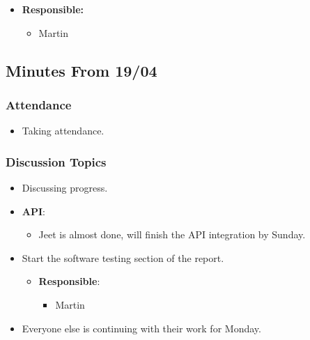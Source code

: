 \documentclass[12pt]{article}
\begin{document}
\begin{enumerate}
  \begin{itemize}
  \tightlist
  \item
    \textbf{Responsible:}

    \begin{itemize}
    \tightlist
    \item
      Martin
    \end{itemize}
  \end{itemize}
\end{enumerate}

\hypertarget{minutes-from-1904}{%
\subsection{Minutes From 19/04}\label{minutes-from-1904}}

\hypertarget{attendance-4}{%
\subsubsection{Attendance}\label{attendance-4}}

\begin{itemize}
\tightlist
\item
  Taking attendance.
\end{itemize}

\hypertarget{discussion-topics-3}{%
\subsubsection{Discussion Topics}\label{discussion-topics-3}}

\begin{itemize}
\tightlist
\item
  Discussing progress.
\item
  \textbf{API}:

  \begin{itemize}
  \tightlist
  \item
    Jeet is almost done, will finish the API integration by Sunday.
  \end{itemize}
\item
  Start the software testing section of the report.

  \begin{itemize}
  \tightlist
  \item
    \textbf{Responsible}:

    \begin{itemize}
    \tightlist
    \item
      Martin
    \end{itemize}
  \end{itemize}
\item
  Everyone else is continuing with their work for Monday.
\end{itemize}
\end{document}

